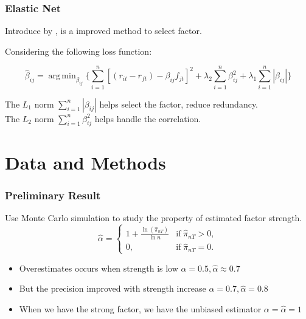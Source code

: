\documentclass[12pt]{beamer}
\DeclareMathOperator*{\argmin}{arg\,min}
\begin{document}
\begin{frame}
\frametitle{Elastic Net}
Introduce by , is a improved method to select factor.

Considering the following loss function:

	\[   \hat{\beta}_{ij}  = \argmin_{\beta_{ij}}\{\sum_{i = 1}^{n}[(r_{it} - r_{ft}) - \beta_{ij }f_{jt}]^2 + \lambda_2\sum_{i = 1}^{n}\beta_{ij}^2  + \lambda_1\sum_{i = 1}^{n}|\beta_{ij}|     \}    \]
	
	The $L_1$ norm $\sum_{i = 1}^{n}|\beta_{ij}|$ helps select the factor, reduce redundancy.\\
    The $L_2$ norm $\sum_{i = 1}^{n}\beta_{ij}^2 $ helps handle the correlation.

\end{frame}




\section{Data and Methods}


\begin{frame}
	\frametitle{Preliminary Result}
Use Monte Carlo simulation to study the property of estimated factor strength.\\
\[ \hat{\alpha} = \begin{cases}
1+\frac{\ln(\hat{\pi}_{nT})}{\ln n} & \text{if}\; \hat{\pi}_{nT} > 0,\\
0, & \text{if}\; \hat{\pi}_{nT} = 0.
\end{cases} \]
\begin{itemize}
\item Overestimates occurs when strength is low $\alpha = 0.5, \hat{\alpha} \approx 0.7$
\item But the precision improved with strength increase $\alpha = 0.7, \hat{\alpha} = 0.8$
\item When we have the strong factor, we have the unbiased estimator $\alpha = \hat{\alpha} = 1$
\end{itemize}
	
\end{frame}
\end{document}
